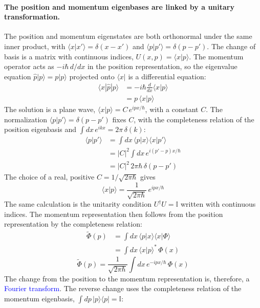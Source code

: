 \documentclass[11pt]{article}      %
\numberwithin{equation}{section}   %
\begin{document}
\paragraph{The position and momentum eigenbases are linked by a unitary transformation.} The position and momentum eigenstates are both orthonormal under the same inner product, with $\langle x | x' \rangle = \delta(x - x')$ and $\langle p | p' \rangle = \delta(p - p')$. The change of basis is a matrix with continuous indices, $U(x, p) = \langle x | p \rangle$. The momentum operator acts as $-i\hbar\, d/dx$ in the position representation, so the eigenvalue equation $\hat p |p\rangle = p |p\rangle$ projected onto $\langle x|$ is a differential equation:
\begin{align*}
    \langle x | \hat p | p \rangle &= -i\hbar \frac{d}{dx} \langle x | p \rangle \\
    &= p\, \langle x | p \rangle
\end{align*}
The solution is a plane wave, $\langle x | p \rangle = C\, e^{ipx/\hbar}$, with a constant $C$. The normalization $\langle p | p' \rangle = \delta(p - p')$ fixes $C$, with the completeness relation of the position eigenbasis and $\int dx\, e^{ikx} = 2\pi\, \delta(k)$:
\begin{align*}
    \langle p | p' \rangle &= \int dx\, \langle p | x \rangle \langle x | p' \rangle \\
    &= |C|^2 \int dx\, e^{i(p' - p)x/\hbar} \\
    &= |C|^2\, 2\pi\hbar\, \delta(p - p')
\end{align*}
The choice of a real, positive $C = 1/\sqrt{2\pi\hbar}$ gives
\begin{equation}
    \boxed{\langle x | p \rangle = \frac{1}{\sqrt{2\pi\hbar}}\, e^{ipx/\hbar}}
\end{equation}
The same calculation is the unitarity condition $U^{\dagger} U = \mathbb{I}$ written with continuous indices. The momentum representation then follows from the position representation by the completeness relation:
\begin{align*}
    \tilde{\Phi}(p) &= \int dx\, \langle p | x \rangle \langle x | \Phi \rangle \\
    &= \int dx\, \langle x | p \rangle^{*}\, \Phi(x)
\end{align*}
\begin{equation}
    \boxed{\tilde{\Phi}(p) = \frac{1}{\sqrt{2\pi\hbar}} \int dx\, e^{-ipx/\hbar}\, \Phi(x)}
\end{equation}
The change from the position to the momentum representation is, therefore, a \textcolor{blue}{Fourier transform}. The reverse change uses the completeness relation of the momentum eigenbasis, $\int dp\, |p\rangle\langle p| = \mathbb{I}$:
\end{document}
